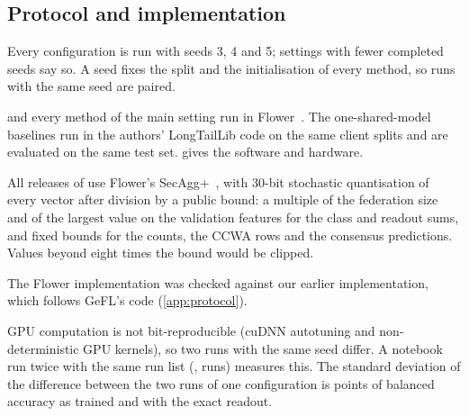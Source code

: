 \subsection{Protocol and implementation}\label{sec:setup-impl}

Every configuration is run with seeds 3, 4 and 5; settings with fewer completed seeds say so. A seed fixes the
split and the initialisation of every method, so runs with the same seed are paired.

\ours and every method of the main setting run in Flower~\cite{beutel2020flower}. The one-shared-model baselines run
in the authors' LongTailLib code on the same client splits and are evaluated on the same test set. 
gives the software and hardware.

All releases of \ours use Flower's SecAgg+~\cite{bell2020secaggplus}, with 30-bit stochastic quantisation of every
vector after division by a public bound: a multiple of the federation size and of the largest value on the
validation features for the class and readout sums, and fixed bounds for the counts, the CCWA rows and the consensus
predictions. Values beyond eight times the bound would be clipped.

The Flower implementation was checked against our earlier implementation, which follows GeFL's code
(\cref{app:protocol}).

GPU computation is not bit-reproducible (cuDNN autotuning and non-deterministic GPU kernels), so two runs with the
same seed differ. A
notebook run twice with the same run list (,  runs) measures this. The
standard deviation of the difference between the two runs of one configuration is  points of
balanced accuracy as trained and  with the exact readout.

